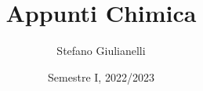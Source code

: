 \documentclass[12pt]{article}
\begin{document}
\author{Stefano Giulianelli}
\title{Appunti Chimica}
\date{Semestre I, 2022/2023}
\maketitle{}
\tableofcontents{}
\end{document}
